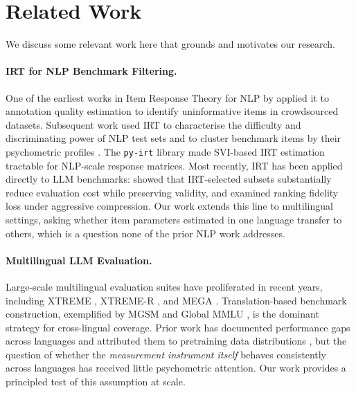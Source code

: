 \documentclass[11pt]{article}
\begin{document}
%


\appendix

\section{Related Work}
\label{app:related}

We discuss some relevant work here that grounds and motivates our research.

\paragraph{IRT for NLP Benchmark Filtering.} One of the earliest works in Item Response Theory for NLP by \citet{lalor2016building} applied it to annotation quality estimation to identify uninformative items in crowdsourced datasets. Subsequent work used IRT to characterise the difficulty and discriminating power of NLP test sets \cite{lalor2019learning, rodriguez2021evaluation} and to cluster benchmark items by their psychometric profiles \cite{rodriguez2022clustering}. The \texttt{py-irt} library \cite{natesan2016bayesian} made SVI-based IRT estimation tractable for NLP-scale response matrices. Most recently, IRT has been applied directly to LLM benchmarks: \citet{hofmann2025fluid} showed that IRT-selected subsets substantially reduce evaluation cost while preserving validity, and \citet{zhou2026lost} examined ranking fidelity loss under aggressive compression. Our work extends this line to multilingual settings, asking whether item parameters estimated in one language transfer to others, which is a question none of the prior NLP work addresses.

\paragraph{Multilingual LLM Evaluation.}
Large-scale multilingual evaluation suites have proliferated in recent years, including XTREME \cite{hu2020xtreme}, XTREME-R \cite{ruder2021xtreme}, and MEGA \cite{ahuja2023mega}. Translation-based benchmark construction, exemplified by MGSM \cite{shi2023language} and Global MMLU \cite{singh2025global}, is the dominant strategy for cross-lingual coverage. Prior work has documented performance gaps across languages and attributed them to pretraining data distributions \cite{lai2023chatgpt, zhang2024mela}, but the question of whether the \emph{measurement instrument itself} behaves consistently across languages has received little psychometric attention. Our work provides a principled test of this assumption at scale.
\end{document}
